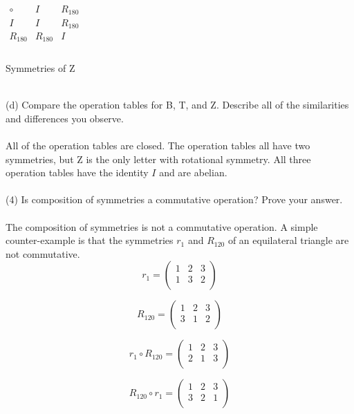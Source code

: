 \documentclass[11pt,a4paper]{article}
\begin{document}
\begin{center}
$
\begin{array}{c|c|c}
\circ & I & R_{180} \\\hline
I & I & R_{180} \\\hline
R_{180} & R_{180} & I \\
\end{array}
$\\
~\\
Symmetries of Z
\end{center}
~\\
(d) Compare the operation tables for B, T, and Z. Describe all of the similarities and differences you observe.\\
~\\
All of the operation tables are closed. The operation tables all have two symmetries, but Z is the only letter with rotational symmetry. All three operation tables have the identity $I$ and are abelian.\\
~\\
(4) Is composition of symmetries a commutative operation? Prove your answer.\\
~\\
The composition of symmetries is not a commutative operation. A simple counter-example is that the symmetries $r_1$ and $R_{120}$ of an equilateral triangle are not commutative.\\

\[
r_1 = \left(\begin{array}{ccc}
1&2&3\\
1&3&2\\
\end{array}\right)
\]

\[
R_{120} = \left(\begin{array}{ccc}
1&2&3\\
3&1&2\\
\end{array}\right)
\]

\[
r_1\circ R_{120} = \left(\begin{array}{ccc}
1&2&3\\
2&1&3\\
\end{array}\right)
\]

\[
 R_{120}\circ r_1 = \left(\begin{array}{ccc}
1&2&3\\
3&2&1\\
\end{array}\right)
\]
\end{document}
